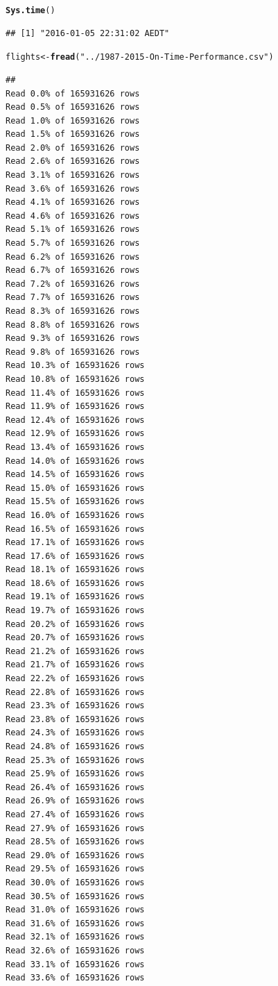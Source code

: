\documentclass{scrreprt}\usepackage[]{graphicx}\usepackage[]{color}
\makeatletter
\newcommand{\hlstr}[1]{\textcolor[rgb]{0.192,0.494,0.8}{#1}}%
\newcommand{\hlstd}[1]{\textcolor[rgb]{0.345,0.345,0.345}{#1}}%
\newcommand{\hlkwb}[1]{\textcolor[rgb]{0.69,0.353,0.396}{#1}}%
\newcommand{\hlkwd}[1]{\textcolor[rgb]{0.737,0.353,0.396}{\textbf{#1}}}%
\newenvironment{kframe}{%
 \def\at@end@of@kframe{}%
 \ifinner\ifhmode%
  \def\at@end@of@kframe{\end{minipage}}%
  \begin{minipage}{\columnwidth}%
 \fi\fi%
 \def\FrameCommand##1{\hskip\@totalleftmargin \hskip-\fboxsep
 \colorbox{shadecolor}{##1}\hskip-\fboxsep
     \hskip-\linewidth \hskip-\@totalleftmargin \hskip\columnwidth}%
 \MakeFramed {\advance\hsize-\width
   \@totalleftmargin\z@ \linewidth\hsize
   \@setminipage}}%
 {\par\unskip\endMakeFramed%
 \at@end@of@kframe}
\newenvironment{knitrout}{}{} %
\makeatother
\begin{document}
\begin{knitrout}
\color{fgcolor}\begin{kframe}
\begin{alltt}
\hlkwd{Sys.time}\hlstd{()}
\end{alltt}
\begin{verbatim}
## [1] "2016-01-05 22:31:02 AEDT"
\end{verbatim}
\begin{alltt}
\hlstd{flights} \hlkwb{<-} \hlkwd{fread}\hlstd{(}\hlstr{"../1987-2015-On-Time-Performance.csv"}\hlstd{)}
\end{alltt}
\begin{verbatim}
## 
Read 0.0% of 165931626 rows
Read 0.5% of 165931626 rows
Read 1.0% of 165931626 rows
Read 1.5% of 165931626 rows
Read 2.0% of 165931626 rows
Read 2.6% of 165931626 rows
Read 3.1% of 165931626 rows
Read 3.6% of 165931626 rows
Read 4.1% of 165931626 rows
Read 4.6% of 165931626 rows
Read 5.1% of 165931626 rows
Read 5.7% of 165931626 rows
Read 6.2% of 165931626 rows
Read 6.7% of 165931626 rows
Read 7.2% of 165931626 rows
Read 7.7% of 165931626 rows
Read 8.3% of 165931626 rows
Read 8.8% of 165931626 rows
Read 9.3% of 165931626 rows
Read 9.8% of 165931626 rows
Read 10.3% of 165931626 rows
Read 10.8% of 165931626 rows
Read 11.4% of 165931626 rows
Read 11.9% of 165931626 rows
Read 12.4% of 165931626 rows
Read 12.9% of 165931626 rows
Read 13.4% of 165931626 rows
Read 14.0% of 165931626 rows
Read 14.5% of 165931626 rows
Read 15.0% of 165931626 rows
Read 15.5% of 165931626 rows
Read 16.0% of 165931626 rows
Read 16.5% of 165931626 rows
Read 17.1% of 165931626 rows
Read 17.6% of 165931626 rows
Read 18.1% of 165931626 rows
Read 18.6% of 165931626 rows
Read 19.1% of 165931626 rows
Read 19.7% of 165931626 rows
Read 20.2% of 165931626 rows
Read 20.7% of 165931626 rows
Read 21.2% of 165931626 rows
Read 21.7% of 165931626 rows
Read 22.2% of 165931626 rows
Read 22.8% of 165931626 rows
Read 23.3% of 165931626 rows
Read 23.8% of 165931626 rows
Read 24.3% of 165931626 rows
Read 24.8% of 165931626 rows
Read 25.3% of 165931626 rows
Read 25.9% of 165931626 rows
Read 26.4% of 165931626 rows
Read 26.9% of 165931626 rows
Read 27.4% of 165931626 rows
Read 27.9% of 165931626 rows
Read 28.5% of 165931626 rows
Read 29.0% of 165931626 rows
Read 29.5% of 165931626 rows
Read 30.0% of 165931626 rows
Read 30.5% of 165931626 rows
Read 31.0% of 165931626 rows
Read 31.6% of 165931626 rows
Read 32.1% of 165931626 rows
Read 32.6% of 165931626 rows
Read 33.1% of 165931626 rows
Read 33.6% of 165931626 rows

\end{verbatim}
\end{kframe}
\end{knitrout}
\end{document}
